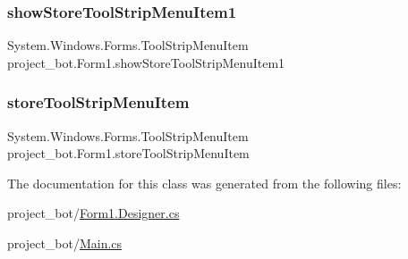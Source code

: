 \subsubsection{\texorpdfstring{show\+Store\+Tool\+Strip\+Menu\+Item1}{showStoreToolStripMenuItem1}}
{\footnotesize\ttfamily System.\+Windows.\+Forms.\+Tool\+Strip\+Menu\+Item project\+\_\+bot.\+Form1.\+show\+Store\+Tool\+Strip\+Menu\+Item1\hspace{0.3cm}{\ttfamily [private]}}

\mbox{\label{classproject__bot_1_1_form1_a085fc9e73481af539c9665378b0544f3}} 
\subsubsection{\texorpdfstring{store\+Tool\+Strip\+Menu\+Item}{storeToolStripMenuItem}}
{\footnotesize\ttfamily System.\+Windows.\+Forms.\+Tool\+Strip\+Menu\+Item project\+\_\+bot.\+Form1.\+store\+Tool\+Strip\+Menu\+Item\hspace{0.3cm}{\ttfamily [private]}}



The documentation for this class was generated from the following files\+:\begin{DoxyCompactItemize}
\item 
project\+\_\+bot/\hyperlink{_form1_8_designer_8cs}{Form1.\+Designer.\+cs}\item 
project\+\_\+bot/\hyperlink{_main_8cs}{Main.\+cs}\end{DoxyCompactItemize}
